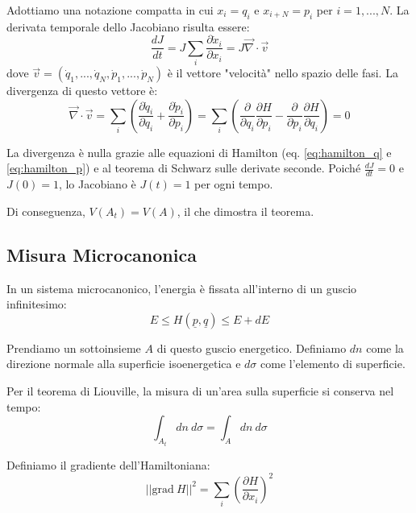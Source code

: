 Adottiamo una notazione compatta in cui $x_i = q_i$ e $x_{i+N} = p_i$ per $i=1,...,N$. La derivata temporale dello Jacobiano risulta essere:
\begin{equation}
    \frac{dJ}{dt} = J \sum_i \frac{\partial \dot{x}_i}{\partial x_i} = J \vec{\nabla} \cdot \vec{v}
    \label{eq:derivata_jacobiano}
\end{equation}
dove $\vec{v} = (\dot{q}_1, ..., \dot{q}_N, \dot{p}_1, ..., \dot{p}_N)$ è il vettore "velocità" nello spazio delle fasi. La divergenza di questo vettore è:
\begin{equation}
    \vec{\nabla} \cdot \vec{v} = \sum_i \left( \frac{\partial \dot{q}_i}{\partial q_i} + \frac{\partial \dot{p}_i}{\partial p_i} \right) = \sum_i \left( \frac{\partial}{\partial q_i}\frac{\partial H}{\partial p_i} - \frac{\partial}{\partial p_i}\frac{\partial H}{\partial q_i} \right) = 0
    \label{eq:divergenza_nulla}
\end{equation}

La divergenza è nulla grazie alle equazioni di Hamilton (eq. \ref{eq:hamilton_q} e \ref{eq:hamilton_p}) e al teorema di Schwarz sulle derivate seconde. Poiché $\frac{dJ}{dt} = 0$ e $J(0)=1$, lo Jacobiano è $J(t)=1$ per ogni tempo.

Di conseguenza, $V(A_t) = V(A)$, il che dimostra il teorema.



\subsection*{Misura Microcanonica}

In un sistema microcanonico, l'energia è fissata all'interno di un guscio infinitesimo:
\begin{equation}
    E \le H(\underline{p},\underline{q}) \le E+dE
    \label{eq:guscio_energetico}
\end{equation}

Prendiamo un sottoinsieme $A$ di questo guscio energetico. Definiamo $dn$ come la direzione normale alla superficie isoenergetica e $d\sigma$ come l'elemento di superficie.

Per il teorema di Liouville, la misura di un'area sulla superficie si conserva nel tempo:
\begin{equation}
    \int_{A_{t}}dn~d\sigma=\int_{A}dn~d\sigma
    \label{eq:conservazione_area}
\end{equation}

Definiamo il gradiente dell'Hamiltoniana:
\begin{equation}
    ||\text{grad}~H||^{2}=\sum_{i}\left(\frac{\partial H}{\partial x_{i}}\right)^{2}
    \label{eq:gradiente_H}
\end{equation}

